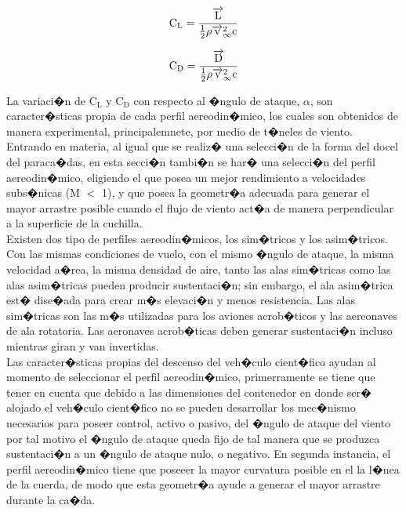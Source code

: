 \documentclass[10pt,a4paper]{book}
\begin{document}
\begin{align}
\notag
\text{C}_{\text{L}} = \frac{\overrightarrow{\text{L}}}{\frac{1}{2} \rho \overrightarrow{\text{v}}_{\infty}^{2}\text{c}}
\end{align}

\begin{align}
\notag
\text{C}_{\text{D}} = \frac{\overrightarrow{\text{D}}}{\frac{1}{2} \rho \overrightarrow{\text{v}}_{\infty}^{2}\text{c}}
\end{align}

La variaci�n de $\text{C}_{\text{L}}$ y $\text{C}_{\text{D}}$ con respecto al �ngulo de ataque, $\alpha$, son caracter�sticas propia de cada perfil aereodin�mico, los cuales son obtenidos de manera experimental, principalemnete, por medio de t�neles de viento.\\

Entrando en materia, al igual que se realiz� una selecci�n de la forma del docel del paraca�das, en esta secci�n  tambi�n se har� una selecci�n del perfil aereodin�mico, eligiendo el que posea un mejor rendimiento a velocidades subs�nicas (M $<$ 1), y que posea la geometr�a adecuada para generar el mayor arrastre posible cuando el flujo de viento act�a de manera perpendicular a la superficie de la cuchilla.\\

Existen dos tipo de perfiles aereodin�micos, los sim�tricos y los asim�tricos. Con  las mismas condiciones de vuelo, con el mismo �ngulo de ataque, la misma velocidad a�rea, la misma densidad de aire, tanto las alas sim�tricas como las alas asim�tricas pueden producir sustentaci�n; sin embargo, el ala asim�trica est� dise�ada para crear m�s elevaci�n y menos resistencia. Las alas sim�tricas son las m�s utilizadas para los aviones acrob�ticos y las aereonaves de ala rotatoria. Las aeronaves acrob�ticas deben generar sustentaci�n incluso mientras giran y van invertidas.\\

Las caracter�sticas propias del descenso del veh�culo cient�fico ayudan al momento de  seleccionar el  perfil aereodin�mico, primerramente se tiene que tener en cuenta que debido a las dimensiones del contenedor en donde ser� alojado el veh�culo cient�fico no se pueden desarrollar los mec�nismo necesarios para poseer control, activo o pasivo, del �ngulo de ataque del viento por tal motivo el �ngulo de ataque queda fijo de tal manera que se produzca sustentaci�n a un �ngulo de ataque nulo, o negativo. En segunda instancia, el perfil aereodin�mico tiene que poseeer la mayor curvatura posible en el la l�nea de la cuerda, de modo que esta geometr�a ayude a generar el mayor arrastre durante la ca�da.\\ 
\end{document}
